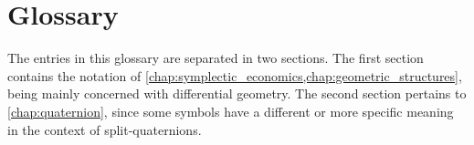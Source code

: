 %
\chapter{Glossary} %
%
%



%

The entries in this glossary are separated in two sections. The first section contains the notation of \cref{chap:symplectic_economics,chap:geometric_structures}, being mainly concerned with differential geometry. The second section pertains to \cref{chap:quaternion}, since some symbols have a different or more specific meaning in the context of split-quaternions. 



